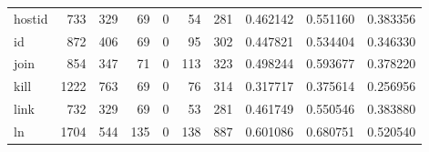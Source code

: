 \begin{tabular}{lrrrrrrrrr}
hostid    &                                                733 &                                                329 &                                                 69 &                                                  0 &                                                 54 &                                                281 &                                           0.462142 &                               0.551160 &                             0.383356 \\
id        &                                                872 &                                                406 &                                                 69 &                                                  0 &                                                 95 &                                                302 &                                           0.447821 &                               0.534404 &                             0.346330 \\
join      &                                                854 &                                                347 &                                                 71 &                                                  0 &                                                113 &                                                323 &                                           0.498244 &                               0.593677 &                             0.378220 \\
kill      &                                               1222 &                                                763 &                                                 69 &                                                  0 &                                                 76 &                                                314 &                                           0.317717 &                               0.375614 &                             0.256956 \\
link      &                                                732 &                                                329 &                                                 69 &                                                  0 &                                                 53 &                                                281 &                                           0.461749 &                               0.550546 &                             0.383880 \\
ln        &                                               1704 &                                                544 &                                                135 &                                                  0 &                                                138 &                                                887 &                                           0.601086 &                               0.680751 &                             0.520540 \\

\end{tabular}
